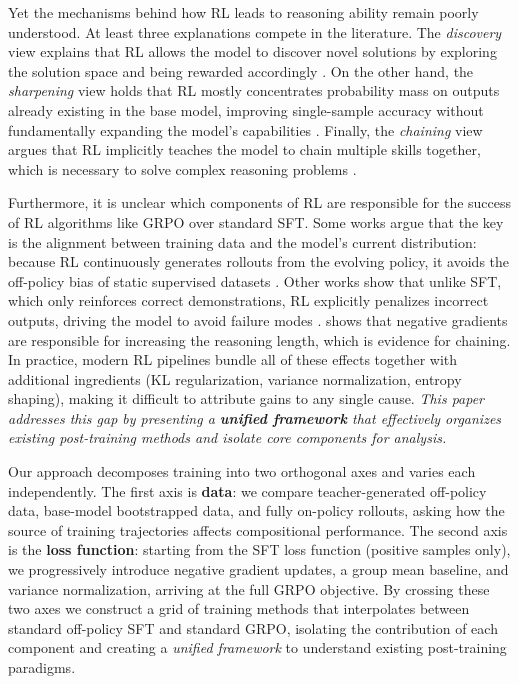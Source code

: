 \documentclass[12pt]{cmuthesis}
\begin{document}
Yet the mechanisms behind how RL leads to reasoning ability remain poorly understood. At least three explanations compete in the literature. The \emph{discovery} view explains that RL allows the model to discover novel solutions by exploring the solution space and being rewarded accordingly \citep{wenReinforcementLearningVerifiable2025}. On the other hand, the \emph{sharpening} view holds that RL mostly concentrates probability mass on outputs already existing in the base model, improving single-sample accuracy without fundamentally expanding the model's capabilities \citep{yueDoesReinforcementLearning2025}. Finally, the \emph{chaining} view argues that RL implicitly teaches the model to chain multiple skills together, which is necessary to solve complex reasoning problems \citep{setlurE3LearningExplore2025}.

Furthermore, it is unclear which components of RL are responsible for the success of RL algorithms like GRPO over standard SFT. Some works argue that the key is the alignment between training data and the model's current distribution: because RL continuously generates rollouts from the evolving policy, it avoids the off-policy bias of static supervised datasets \citep{chenRetainingDoingRole2025,mingOneTokenRolloutGuiding2026}.
Other works show that unlike SFT, which only reinforces correct demonstrations, RL explicitly penalizes incorrect outputs, driving the model to avoid failure modes \citep{tian_learning_2026}. \citet{setlurE3LearningExplore2025} shows that negative gradients are responsible for increasing the reasoning length, which is evidence for chaining.
In practice, modern RL pipelines bundle all of these effects together with additional ingredients (KL regularization, variance normalization, entropy shaping), making it difficult to attribute gains to any single cause. \emph{This paper addresses this gap by presenting a \textbf{unified framework} that effectively organizes existing post-training methods and isolate core components for analysis.}

Our approach decomposes training into two orthogonal axes and varies each independently. The first axis is \textbf{data}: we compare teacher-generated off-policy data, base-model bootstrapped data, and fully on-policy rollouts, asking how the source of training trajectories affects compositional performance. The second axis is the \textbf{loss function}: starting from the SFT loss function (positive samples only), we progressively introduce negative gradient updates, a group mean baseline, and variance normalization, arriving at the full GRPO objective. By crossing these two axes we construct a grid of training methods that interpolates between standard off-policy SFT and standard GRPO, isolating the contribution of each component and creating a \emph{unified framework} to understand existing post-training paradigms.
\end{document}
